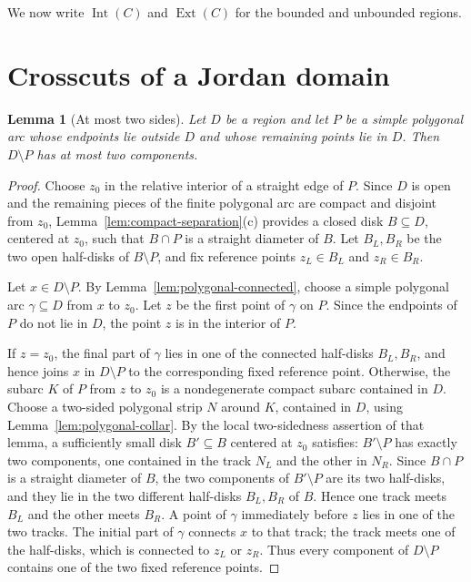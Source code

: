 \documentclass[11pt]{article}
\theoremstyle{mainplain}
\newtheorem{lemma}[theorem]{Lemma}
\theoremstyle{mainroman}
\theoremstyle{definition}
\numberwithin{equation}{section}
\begin{document}
We now write $\operatorname{Int}(C)$ and $\operatorname{Ext}(C)$ for
the bounded and unbounded regions.

\section{Crosscuts of a Jordan domain}

\begin{lemma}[At most two sides]\label{lem:crosscut-at-most-two}
Let $D$ be a region and let $P$ be a simple polygonal arc whose
endpoints lie outside $D$ and whose remaining points lie in $D$. Then
$D\setminus P$ has at most two components.
\end{lemma}
\begin{proof}
Choose $z_0$ in the relative interior of a straight edge of $P$.
Since $D$ is open and the remaining pieces of the finite polygonal arc
are compact and disjoint from $z_0$,
Lemma~\ref{lem:compact-separation}\textup{(c)} provides a closed disk
$B\subseteq D$, centered at $z_0$, such that $B\cap P$ is a straight
diameter of $B$. Let $B_L,B_R$ be the two open half-disks of
$B\setminus P$, and fix reference points $z_L\in B_L$ and
$z_R\in B_R$.

Let $x\in D\setminus P$. By Lemma~\ref{lem:polygonal-connected}, choose a
simple polygonal arc $\gamma\subseteq D$ from $x$ to $z_0$. Let $z$ be
the first point of $\gamma$ on $P$. Since the endpoints of $P$ do not
lie in $D$, the point $z$ is in the interior of $P$.

If $z=z_0$, the final part of $\gamma$ lies in one of the connected
half-disks $B_L,B_R$, and hence joins $x$ in $D\setminus P$ to the
corresponding fixed reference point. Otherwise, the subarc $K$ of $P$
from $z$ to $z_0$ is a nondegenerate compact subarc contained in $D$.
Choose a two-sided polygonal strip $N$ around $K$, contained in $D$,
using Lemma~\ref{lem:polygonal-collar}. By the local two-sidedness
assertion of that lemma, a sufficiently small disk $B'\subseteq B$
centered at $z_0$ satisfies: $B'\setminus P$ has exactly two
components, one contained in the track $N_L$ and the other in $N_R$.
Since $B\cap P$ is a straight diameter of $B$, the two components of
$B'\setminus P$ are its two half-disks, and they lie in the two
different half-disks $B_L,B_R$ of $B$. Hence one track meets $B_L$
and the other meets $B_R$. A point of $\gamma$ immediately before $z$
lies in
one of the two tracks. The initial part of $\gamma$ connects $x$ to
that track; the track meets one of the half-disks, which is connected
to $z_L$ or $z_R$. Thus every component of $D\setminus P$ contains one
of the two fixed reference points.
\end{proof}
\end{document}
